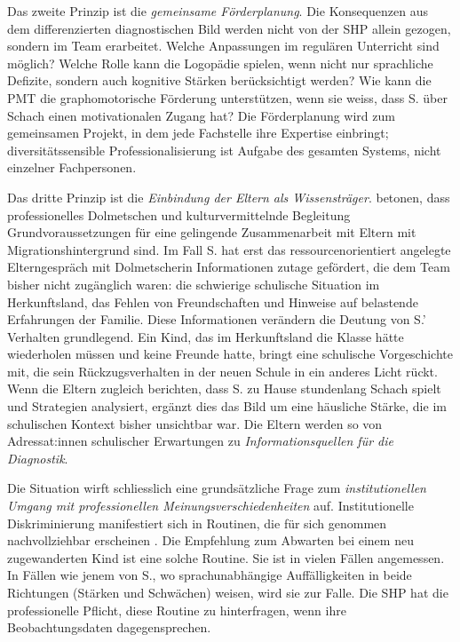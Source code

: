 \documentclass[ngerman, a4paper]{article}
\begin{document}
Das zweite Prinzip ist die \textit{gemeinsame Förderplanung}. Die
Konsequenzen aus dem differenzierten diagnostischen Bild werden nicht von
der SHP allein gezogen, sondern im Team erarbeitet. Welche Anpassungen
im regulären Unterricht sind möglich? Welche Rolle kann die Logopädie
spielen, wenn nicht nur sprachliche Defizite, sondern auch kognitive
Stärken berücksichtigt werden? Wie kann die PMT die graphomotorische
Förderung unterstützen, wenn sie weiss, dass S. über Schach einen
motivationalen Zugang hat? Die Förderplanung wird zum gemeinsamen Projekt,
in dem jede Fachstelle ihre Expertise einbringt; diversitätssensible
Professionalisierung ist Aufgabe des gesamten Systems, nicht einzelner
Fachpersonen.

Das dritte Prinzip ist die \textit{Einbindung der Eltern als Wissensträger}.
\textcite[S.\,39]{kosoroklabhart2021voneltern} betonen, dass
professionelles Dolmetschen und kulturvermittelnde Begleitung
Grundvoraussetzungen für eine gelingende Zusammenarbeit mit Eltern mit
Migrationshintergrund sind. Im Fall S. hat erst das
ressourcenorientiert angelegte Elterngespräch mit Dolmetscherin Informationen
zutage gefördert, die dem Team bisher nicht zugänglich waren: die schwierige
schulische Situation im Herkunftsland, das Fehlen von Freundschaften und Hinweise
auf belastende Erfahrungen der Familie. Diese Informationen verändern die
Deutung von S.' Verhalten grundlegend. Ein Kind, das im Herkunftsland die
Klasse hätte wiederholen müssen und keine Freunde hatte, bringt eine
schulische Vorgeschichte mit, die sein Rückzugsverhalten in der neuen Schule
in ein anderes Licht rückt. Wenn die Eltern zugleich berichten, dass S. zu
Hause stundenlang Schach spielt und Strategien analysiert, ergänzt dies das
Bild um eine häusliche Stärke, die im schulischen Kontext bisher unsichtbar
war. Die Eltern werden so von Adressat:innen schulischer Erwartungen zu
\textit{Informationsquellen für die Diagnostik}.

Die Situation wirft schliesslich eine grundsätzliche Frage zum
\textit{institutionellen Umgang mit professionellen Meinungsverschiedenheiten}
auf. Institutionelle Diskriminierung manifestiert sich in Routinen, die für sich
genommen nachvollziehbar erscheinen
\parencite[vgl.][S.\,84\psq]{horvath2021elite}. Die Empfehlung zum Abwarten bei
einem neu zugewanderten Kind ist eine solche Routine. Sie ist in vielen Fällen
angemessen. In Fällen wie jenem von S., wo sprachunabhängige Auffälligkeiten
in beide Richtungen (Stärken und Schwächen) weisen, wird sie zur Falle.
Die SHP hat die professionelle Pflicht, diese Routine zu hinterfragen, wenn
ihre Beobachtungsdaten dagegensprechen.
\end{document}
